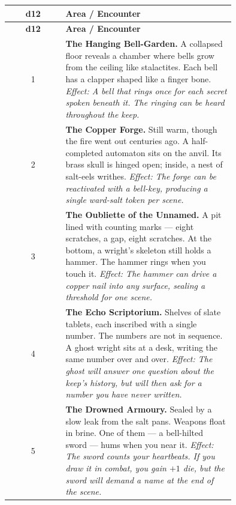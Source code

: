 \begin{tcolorbox}[
  enhanced,
  breakable,
  colback=black!3,
  colframe=blue!60!black,
  title={Generator --- Black Barrow Keep: Rooms \& Encounters},
  left=2mm,right=2mm,top=2mm,bottom=2mm
]
\medskip

\begin{longtable}{|c|p{0.75\linewidth}|}
\hline
\textbf{d12} & \textbf{Area / Encounter} \\ \hline
\endfirsthead
\hline
\textbf{d12} & \textbf{Area / Encounter} \\ \hline
\endhead

1 & \textbf{The Hanging Bell-Garden.}
    A collapsed floor reveals a chamber where bells grow from the
    ceiling like stalactites. Each bell has a clapper shaped like a
    finger bone. \textit{Effect: A bell that rings once for each secret
    spoken beneath it. The ringing can be heard throughout the keep.} \\ \hline

2 & \textbf{The Copper Forge.}
    Still warm, though the fire went out centuries ago. A half-completed
    automaton sits on the anvil. Its brass skull is hinged open; inside,
    a nest of salt-eels writhes. \textit{Effect: The forge can be
    reactivated with a bell-key, producing a single ward-salt token per
    scene.} \\ \hline

3 & \textbf{The Oubliette of the Unnamed.}
    A pit lined with counting marks --- eight scratches, a gap, eight
    scratches. At the bottom, a wright's skeleton still holds a
    hammer. The hammer rings when you touch it.
    \textit{Effect: The hammer can drive a copper nail into any surface,
    sealing a threshold for one scene.} \\ \hline

4 & \textbf{The Echo Scriptorium.}
    Shelves of slate tablets, each inscribed with a single number. The
    numbers are not in sequence. A ghost wright sits at a desk,
    writing the same number over and over.
    \textit{Effect: The ghost will answer one question about the keep's
    history, but will then ask for a number you have never written.} \\ \hline

5 & \textbf{The Drowned Armoury.}
    Sealed by a slow leak from the salt pans. Weapons float in brine.
    One of them --- a bell-hilted sword --- hums when you near it.
    \textit{Effect: The sword counts your heartbeats. If you draw it in
    combat, you gain $+1$ die, but the sword will demand a name at the end
    of the scene.} \\ \hline


\end{longtable}
\end{tcolorbox}
